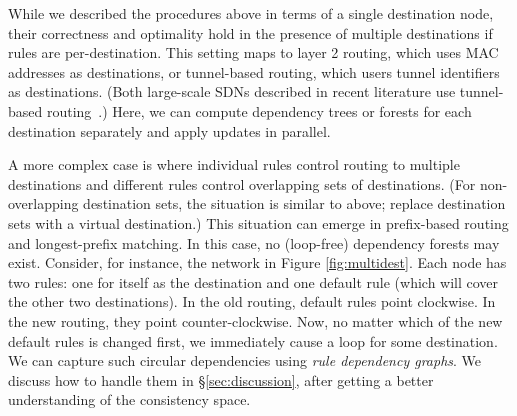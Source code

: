 While we described the procedures above in terms of a single destination node, their correctness and optimality hold in the presence of multiple destinations if rules are per-destination. This setting maps to layer 2 routing, which uses MAC addresses as destinations, or tunnel-based routing, which users tunnel identifiers as destinations. (Both large-scale SDNs described in recent literature use tunnel-based routing~\cite{swan,b4}.) Here, we can compute dependency trees or forests for each destination separately and apply updates in parallel.


A more complex case is where individual rules control routing to multiple destinations and different rules control overlapping sets of destinations. (For non-overlapping destination sets, the situation is similar to above; replace destination sets with a virtual destination.) This situation can emerge in prefix-based routing and longest-prefix matching. In this case, no (loop-free) dependency forests may exist. Consider, for instance, the network in Figure \ref{fig:multidest}. Each node has two rules: one for itself as the destination and one default rule (which will cover the other two destinations).  In the old routing, default rules point clockwise. In the new routing, they point counter-clockwise. Now, no matter which of the new default rules is changed first, we immediately cause a loop for some destination. We can capture such circular dependencies using {\em rule dependency graphs}. We discuss how to handle them in \S\ref{sec:discussion}, after getting a better understanding of the consistency space.



